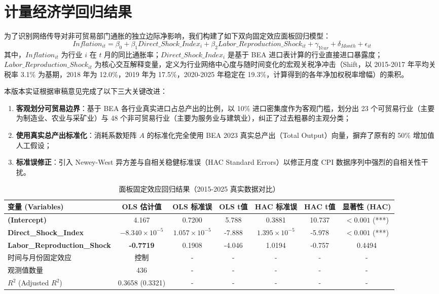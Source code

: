 \documentclass[UTF8,a4paper,11pt]{ctexart}
\begin{document}
\section{计量经济学回归结果}
为了识别网络传导对非可贸易部门通胀的独立边际净影响，我们构建了如下双向固定效应面板回归模型：
\[Inflation_{it} = \beta_0 + \beta_1 Direct\_Shock\_Index_{i} + \beta_2 Labor\_Reproduction\_Shock_{it} + \gamma_{Year} + \delta_{Month} + \epsilon_{it}\]
其中，$Inflation_{it}$ 为行业 $i$ 在 $t$ 月的同比通胀率；$Direct\_Shock\_Index_i$ 是基于 BEA 进口表计算的行业直接进口暴露度；$Labor\_Reproduction\_Shock_{it}$ 为核心交互解释变量，定义为行业网络中心度与随时间变化的宏观关税净冲击（Shift，以 2015-2017 年平均关税率 3.1\% 为基期，2018 年为 12.0\%，2019 年为 17.5\%，2020-2025 年稳定在 19.3\%，计算得到的各年净加权税率增幅）的乘积。

本版本实证根据审稿意见完成了以下三大关键改进：
\begin{enumerate}
    \item \textbf{客观划分可贸易边界}：基于 BEA 各行业真实进口占总产出的比例，以 10\% 进口密集度作为客观门槛，划分出 23 个可贸易行业（主要为制造业、农业与采矿业）与 48 个非可贸易行业（主要为服务业与建筑业），纠正了过去粗暴的主观分类；
    \item \textbf{使用真实总产出标准化}：消耗系数矩阵 $A$ 的标准化完全使用 BEA 2023 真实总产出（Total Output）向量，摒弃了原有的 50\% 增加值人工假设；
    \item \textbf{标准误修正}：引入 Newey-West 异方差与自相关稳健标准误（HAC Standard Errors）以修正月度 CPI 数据序列中强烈的自相关性干扰。
\end{enumerate}

\begin{table}[H]
\centering
\caption{面板固定效应回归结果（2015-2025 真实数据对比）}
\label{tab:regression}
\begin{tabular}{lcccccc}
\toprule
变量 (Variables) & OLS 估计值 & OLS 标准误 & OLS t值 & HAC 标准误 & HAC t值 & 显著性 (HAC) \\
\midrule
\textbf{(Intercept)} & 4.167 & 0.7200 & 5.788 & 0.3881 & 10.737 & $< 0.001$ (***) \\
\textbf{Direct\_Shock\_Index} & $-8.340\times 10^{-5}$ & $1.057\times 10^{-5}$ & -7.888 & $1.395\times 10^{-5}$ & -5.978 & $< 0.001$ (***) \\
\textbf{Labor\_Reproduction\_Shock} & \textbf{-0.7719} & 0.1908 & -4.046 & 1.0194 & -0.757 & 0.4494 \\
\midrule
时间与月份固定效应 & 控制 & - & - & - & - & - \\
观测值数量 & 436 & - & - & - & - & - \\
$R^2$ (Adjusted $R^2$) & 0.3658 (0.3321) & - & - & - & - & - \\
\bottomrule
\end{tabular}
\end{table}
\end{document}
